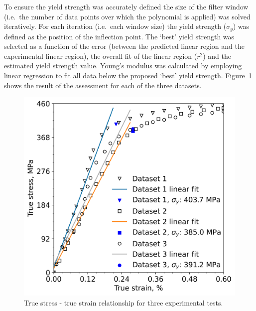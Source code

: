 \documentclass[preprint, review, 12pt]{elsarticle}
\begin{document}
	To ensure the yield strength was accurately defined the size of the filter window (i.e.\ the number of data points over which the polynomial is applied) was solved iteratively.
	For each iteration (i.e.\ each window size) the yield strength ($\sigma_y$) was defined as the position of the inflection point.
	The `best' yield strength was selected as a function of the error (between the predicted linear region and the experimental linear region), the overall fit of the linear region ($r^2$) and the estimated yield strength value.
	Young's modulus was calculated by employing linear regression to fit all data below the proposed `best' yield strength.
	Figure~\ref{fig:linear_region} shows the result of the assessment for each of the three datasets.

	\begin{figure}[!htbp]
		\centering
		\includegraphics[width=\linewidth, height=0.4\textheight, keepaspectratio]{SECOND_DERIV}
		\caption{True stress - true strain relationship for three experimental tests.}
		\label{fig:linear_region}
	\end{figure}
\end{document}
